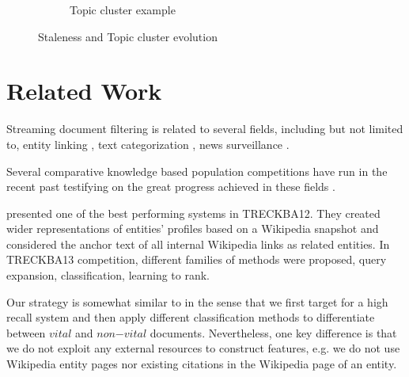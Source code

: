 \documentclass{article}
\begin{document}
\begin{figure}[tb]
\begin{subfigure}[b]{0.25\textwidth}
			\caption{Topic cluster example}
			\label{wordcloud}
        \end{subfigure}
        \caption{Staleness and Topic cluster evolution}
\end{figure}

\section{Related Work}
\label{related}

Streaming document filtering is related to several fields, including but not limited to, entity linking \cite{KBP11}, text categorization \cite{HLTCOE12}, news surveillance \cite{Steinberger14}.

Several comparative knowledge based population competitions have run in the recent past testifying on the great progress achieved in these fields \cite{gross_doucet_toivonen_trec12}. 

\citet{xitong12} presented one of the best performing systems in TRECKBA12. They created wider representations of entities' profiles based on a Wikipedia snapshot and considered the anchor text of all internal Wikipedia links as related entities. In TRECKBA13 competition, different families of methods were proposed, query expansion, classification, learning to rank. 

Our strategy is somewhat similar to \citet{jingang13} in the sense that we first target for a high recall system and then apply different classification methods to differentiate between $vital$ and $non\mathord{-}vital$ documents. Nevertheless, one key difference is that we do not exploit any external resources to construct features, e.g. we do not use Wikipedia entity pages nor existing citations in the Wikipedia page of an entity. 
\end{document}
